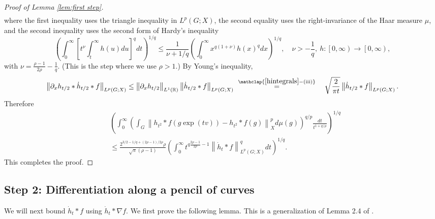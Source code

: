 \documentclass[11pt,reqno]{amsart}
\newcommand{\1}{\mathbf 1}
\begin{document}
\begin{proof}[Proof of Lemma \ref{lem:first step}]
\begin{align*}
\end{align*}
where the first inequality uses the triangle inequality in $L^p\left(G;X\right)$, the second equality uses the right-invariance of the Haar measure $\mu$, and the second inequality uses the second form of Hardy's inequality \cite[Theorem 330]{hardy1952inequalities}
\begin{equation}\label{secondHardy}
\left(\int_0^\infty \left[t^\nu \int_t^\infty h\left(u\right)du\right]^qdt\right)^{1/q}\le \frac{1}{\nu+1/q}\left(\int_0^\infty x^{q\left(1+\nu\right)}h\left(x\right)^qdx\right)^{1/q},\quad \nu>-\frac 1q,~h:\left[0,\infty\right)\to \left[0,\infty\right),
\end{equation}
with $\nu=\frac{\rho-1}{2\rho}-\frac{1}{q}$. (This is the step where we use $\rho>1$.)
By Young's inequality,
\[
\left\| \partial_xh_{t/2}*\dot{h}_{t/2}*f\right\|_{L^p\left(G;X\right)}\le \left\|\partial_xh_{t/2}\right\|_{L^1\left(\mathbb{R}\right)}\left\|\dot{h}_{t/2}*f\right\|_{L^p\left(G;X\right)}~\stackrel{\mathclap{\eqref{hintegrals}-\mathrm{(iii)}}}{=} \quad\sqrt{\frac{2}{\pi t}} \left\|\dot{h}_{t/2}*f\right\|_{L^p\left(G;X\right)}.
\]
Therefore
\begin{align*}
&\left(\int_0^\infty\left( \int_{G}\left\|h_{t^2}*f\left(g\exp\left(tv\right)\right)-h_{t^2}*f\left(g\right)\right\|_X^pd\mu\left(g\right)\right)^{q/p}\frac{dt}{t^{1+q/\rho}}\right)^{1/q}\\
&\le \frac{2^{3/2-1/q+\left(2\rho-1\right)/2\rho}\rho}{\sqrt{\pi}\left(\rho-1\right)}\left( \int_0^\infty  t^{q\frac{2\rho-1}{2\rho}-1}  \left\|\dot{h}_{t}*f\right\|_{L^p\left(G;X\right)}^q dt\right)^{1/q}.
\end{align*}
This completes the proof.
\end{proof}


\subsection{Step 2: Differentiation along a pencil of curves}\label{subsec:step2} We will next bound $\dot{h}_t*f$ using $\dot{h}_t*\nabla f$. We first prove the following lemma. This is a generalization of Lemma 2.4 of \cite{lafforgue2014vertical}.
\end{document}
